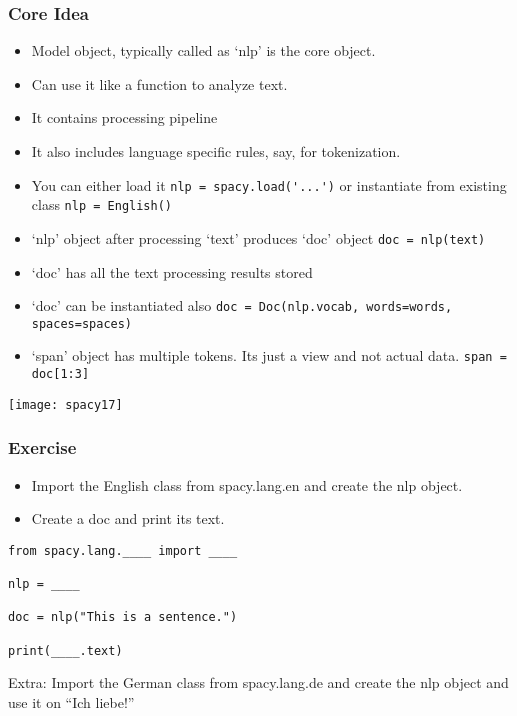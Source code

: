 \begin{frame}[fragile]\frametitle{Core Idea}
  \begin{itemize}
    \item Model object, typically called as `nlp' is the core object.
			\item Can use it like a function to analyze text.
		\item It contains processing pipeline
		\item It also includes language specific rules, say, for tokenization.
		\item You can either load it \lstinline|nlp = spacy.load('...')| or instantiate from existing class \lstinline|nlp = English()|
		\item `nlp' object after processing `text' produces `doc' object \lstinline|doc = nlp(text)|
		\item `doc' has all the text processing results stored
		\item `doc' can be instantiated also \lstinline|doc = Doc(nlp.vocab, words=words, spaces=spaces)|
		\item `span' object has multiple tokens. Its just a view and not actual data. \lstinline|span = doc[1:3]|
  \end{itemize}
	
\begin{center}
\texttt{[image: spacy17]}
\end{center}

\end{frame}

\begin{frame}[fragile]\frametitle{Exercise}

  \begin{itemize}
    \item Import the English class from spacy.lang.en and create the nlp object.
    \item Create a doc and print its text.
  \end{itemize}

  \begin{lstlisting}
from spacy.lang.____ import ____

nlp = ____

doc = nlp("This is a sentence.")

print(____.text)
  \end{lstlisting}

Extra: Import the German class from spacy.lang.de and create the nlp object and use it on ``Ich liebe!''

\end{frame}

